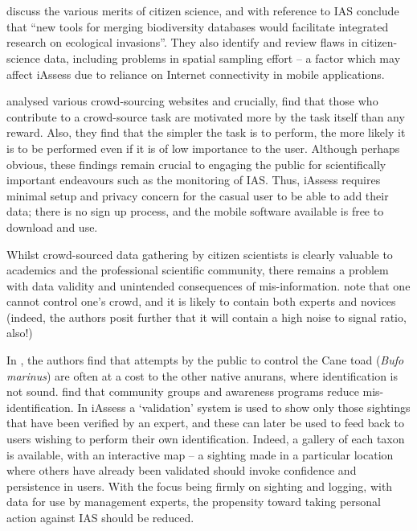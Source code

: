 \documentclass[10pt,psfig,letterpaper,twocolumn]{article}
\begin{document}
\section*{}

\citet{Dickinson:2010ug} discuss the various merits of citizen science, and with reference to IAS conclude that ``new tools for merging biodiversity databases would facilitate integrated research on ecological invasions''.
They also identify and review flaws in citizen-science data, including problems in spatial sampling effort --
a factor which may affect iAssess due to reliance on Internet connectivity in mobile applications.

\citet{Wightman:2010un} analysed various crowd-sourcing websites and crucially, find that those who contribute to a crowd-source task are motivated more by the task itself than any reward.
Also, they find that the simpler the task is to perform, the more likely it is to be performed even if it is of low importance to the user.
Although perhaps obvious, these findings remain crucial to engaging the public for scientifically important endeavours such as the monitoring of IAS.
Thus, iAssess requires minimal setup and privacy concern for the casual user to be able to add their data; there is no sign up process, and the mobile software available is free to download and use.

Whilst crowd-sourced data gathering by citizen scientists is clearly valuable to academics and the professional scientific community,
there remains a problem with data validity and unintended consequences of mis-information.
\citet{Schenk:2009ud} note that one cannot control one's crowd,
and it is likely to contain both experts and novices
(indeed, the authors posit further that it will contain a high noise to signal ratio, also!)

In \citet{Somaweera:2010vi}, the authors find that attempts by the public to control the Cane toad (\emph{Bufo marinus}) are often at a cost to the other native anurans, where identification is not sound.
\citet{Somaweera:2010vi} find that community groups and awareness programs reduce mis-identification.
In iAssess a `validation' system is used to show only those sightings that have been verified by an expert, and these can later be used to feed back to users wishing to perform their own identification.
Indeed, a gallery of each taxon is available, with an interactive map -- a sighting made in a particular location where others have already been validated should invoke confidence and persistence in users.
With the focus being firmly on sighting and logging, with data for use by management experts, the propensity toward taking personal action against IAS should be reduced. 
\end{document}

